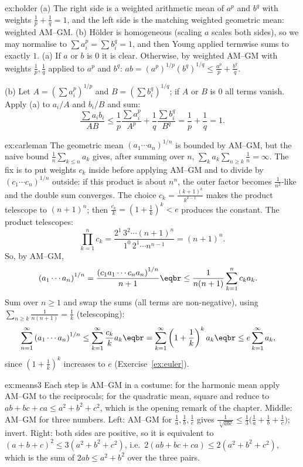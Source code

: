 \begin{solution}{ex:holder}
\idea (a) The right side is a weighted arithmetic mean of $a^p$ and $b^q$ with weights $\frac1p+\frac1q=1$, and the left side is the matching weighted geometric mean: weighted AM--GM. (b) H\"older is homogeneous (scaling $a$ scales both sides), so we may normalise to $\sum a_i^p=\sum b_i^q=1$, and then Young applied termwise sums to exactly $1$.
\writeup (a) If $a$ or $b$ is $0$ it is clear. Otherwise, by weighted AM--GM with weights $\frac1p,\frac1q$ applied to $a^p$ and $b^q$:
$ab=(a^p)^{1/p}(b^q)^{1/q}\le\frac{a^p}p+\frac{b^q}q$.

(b) Let $A=\left(\sum a_i^p\right)^{1/p}$ and $B=\left(\sum b_i^q\right)^{1/q}$; if $A$ or $B$ is $0$ all terms vanish. Apply (a) to $a_i/A$ and $b_i/B$ and sum:
\[
\frac{\sum a_ib_i}{AB}\le\frac1p\frac{\sum a_i^p}{A^p}+\frac1q\frac{\sum b_i^q}{B^q}=\frac1p+\frac1q=1.
\]
\end{solution}

\begin{solution}{ex:carleman}
\idea The geometric mean $(a_1\cdots a_n)^{1/n}$ is bounded by AM--GM, but the naive bound $\frac1n\sum_{k\le n}a_k$ gives, after summing over $n$, $\sum_ka_k\sum_{n\ge k}\frac1n=\infty$. The fix is to put weights $c_k$ inside before applying AM--GM and to divide by $(c_1\cdots c_n)^{1/n}$ outside: if this product is about $n^n$, the outer factor becomes $\frac1{n^2}$-like and the double sum converges. The choice $c_k=\frac{(k+1)^k}{k^{k-1}}$ makes the product telescope to $(n+1)^n$; then $\frac{c_k}k=\left(1+\frac1k\right)^k<e$ produces the constant.
\writeup The product telescopes:
\[\prod_{k=1}^nc_k=\frac{2^1\,3^2\cdots(n+1)^n}{1^0\,2^1\cdots n^{n-1}}=(n+1)^n.\]
So, by AM--GM,
\[
\begin{aligned}\left(a_1\cdots a_n\right)^{1/n}&=\frac{\left(c_1a_1\cdots c_na_n\right)^{1/n}}{n+1}\eqbr\le\frac1{n(n+1)}\sum_{k=1}^nc_ka_k.\end{aligned}
\]
Sum over $n\ge1$ and swap the sums (all terms are non-negative), using $\sum_{n\ge k}\frac1{n(n+1)}=\frac1k$ (telescoping):
\[
\begin{aligned}\sum_{n=1}^\infty\left(a_1\cdots a_n\right)^{1/n}&\le\sum_{k=1}^\infty\frac{c_k}ka_k\eqbr=\sum_{k=1}^\infty\left(1+\frac1k\right)^ka_k\eqbr\le e\sum_{k=1}^\infty a_k,\end{aligned}
\]
since $\left(1+\frac1k\right)^k$ increases to $e$ (Exercise~\ref{ex:euler}).
\end{solution}

\begin{solution}{ex:means3}
\idea Each step is AM--GM in a costume: for the harmonic mean apply AM--GM to the reciprocals; for the quadratic mean, square and reduce to $ab+bc+ca\le a^2+b^2+c^2$, which is the opening remark of the chapter.
\writeup Middle: AM--GM for three numbers. Left: AM--GM for $\frac1a,\frac1b,\frac1c$ gives $\frac1{\sqrt[3]{abc}}\le\frac13\bigl(\frac1a+\frac1b+\frac1c\bigr)$; invert. Right: both sides are positive, so it is equivalent to $(a+b+c)^2\le3(a^2+b^2+c^2)$, i.e.\ $2(ab+bc+ca)\le2(a^2+b^2+c^2)$, which is the sum of $2ab\le a^2+b^2$ over the three pairs.
\end{solution}

